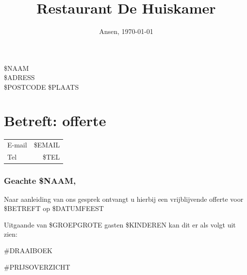 \documentclass{scrartcl}
\begin{document}

\title{Restaurant De Huiskamer}
\date{Ansen, \today}
\maketitle
\thispagestyle{footer}

\begin{flushright}
	\$NAAM \\
	\$ADRESS \\
	\$POSTCODE \$PLAATS
\end{flushright}
\section*{Betreft: offerte}
\begin{tabular}{ l r }
  E-mail & \$EMAIL  \\
  Tel & \$TEL  \\
\end{tabular}


\subsubsection*{Geachte \$NAAM,}

Naar aanleiding van ons gesprek ontvangt u hierbij een vrijblijvende offerte
voor \$BETREFT op \$DATUMFEEST

Uitgaande van \$GROEPGROTE gasten \$KINDEREN kan dit er als volgt uit zien:

\#DRAAIBOEK

\newpage

\#PRIJSOVERZICHT
\end{document}
